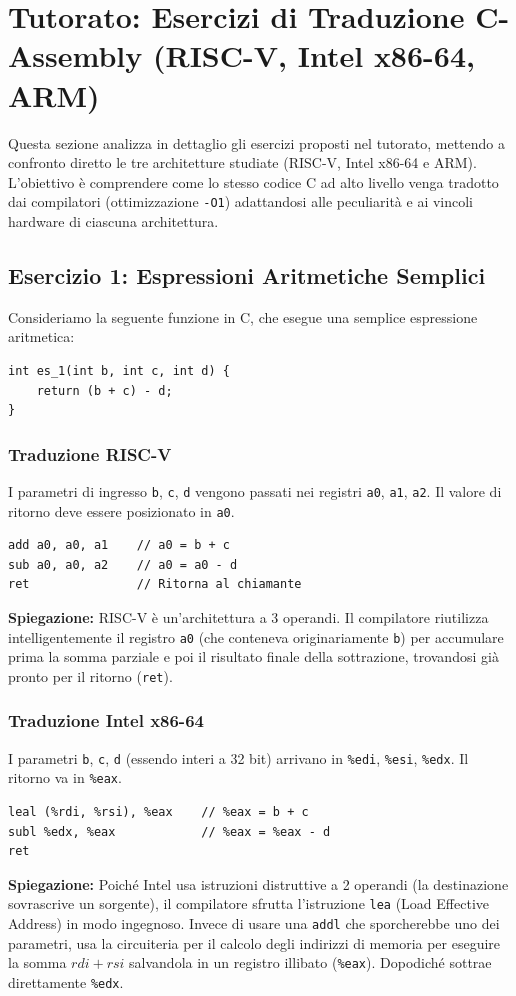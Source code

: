 \documentclass[12pt, a4paper]{article}
\begin{document}
\section{Tutorato: Esercizi di Traduzione C-Assembly (RISC-V, Intel x86-64, ARM)}

Questa sezione analizza in dettaglio gli esercizi proposti nel tutorato, mettendo a confronto diretto le tre architetture studiate (RISC-V, Intel x86-64 e ARM). L'obiettivo è comprendere come lo stesso codice C ad alto livello venga tradotto dai compilatori (ottimizzazione \texttt{-O1}) adattandosi alle peculiarità e ai vincoli hardware di ciascuna architettura.

\subsection{Esercizio 1: Espressioni Aritmetiche Semplici}
Consideriamo la seguente funzione in C, che esegue una semplice espressione aritmetica:
\begin{verbatim}
int es_1(int b, int c, int d) {
    return (b + c) - d;
}
\end{verbatim}

\newpage

\subsubsection{Traduzione RISC-V}
I parametri di ingresso \texttt{b}, \texttt{c}, \texttt{d} vengono passati nei registri \texttt{a0}, \texttt{a1}, \texttt{a2}. Il valore di ritorno deve essere posizionato in \texttt{a0}.
\begin{verbatim}
add a0, a0, a1    // a0 = b + c 
sub a0, a0, a2    // a0 = a0 - d 
ret               // Ritorna al chiamante
\end{verbatim}
\textbf{Spiegazione:} RISC-V è un'architettura a 3 operandi. Il compilatore riutilizza intelligentemente il registro \texttt{a0} (che conteneva originariamente \texttt{b}) per accumulare prima la somma parziale e poi il risultato finale della sottrazione, trovandosi già pronto per il ritorno (\texttt{ret}).

\subsubsection{Traduzione Intel x86-64}
I parametri \texttt{b}, \texttt{c}, \texttt{d} (essendo interi a 32 bit) arrivano in \texttt{\%edi}, \texttt{\%esi}, \texttt{\%edx}. Il ritorno va in \texttt{\%eax}.
\begin{verbatim}
leal (%rdi, %rsi), %eax    // %eax = b + c
subl %edx, %eax            // %eax = %eax - d
ret
\end{verbatim}
\textbf{Spiegazione:} Poiché Intel usa istruzioni distruttive a 2 operandi (la destinazione sovrascrive un sorgente), il compilatore sfrutta l'istruzione \texttt{lea} (Load Effective Address) in modo ingegnoso. Invece di usare una \texttt{addl} che sporcherebbe uno dei parametri, usa la circuiteria per il calcolo degli indirizzi di memoria per eseguire la somma $rdi + rsi$ salvandola in un registro illibato (\texttt{\%eax}). Dopodiché sottrae direttamente \texttt{\%edx}.
\end{document}
